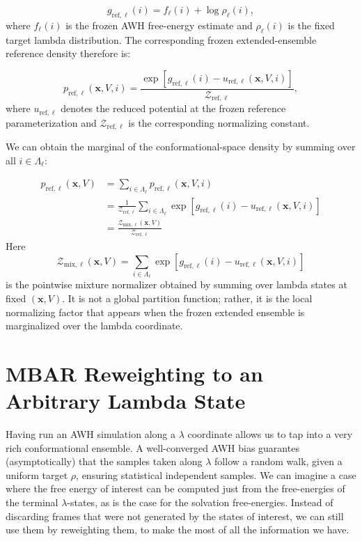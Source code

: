 \begin{equation}
    g_{\mathrm{ref},\ell}(i)
    =
    f_\ell(i)
    +
    \log \rho_\ell(i),
    \label{eq:gref}
\end{equation}
%
where $f_\ell(i)$ is the frozen AWH free-energy estimate and $\rho_\ell(i)$ is the fixed target lambda distribution. The corresponding frozen extended-ensemble reference density therefore is:

\begin{equation}
    p_{\mathrm{ref},\ell}(\mathbf{x}, V, i)
    =
    \frac{
        \exp \left[
            g_{\mathrm{ref},\ell}(i)
            -
            u_{\mathrm{ref},\ell}(\mathbf{x}, V, i)
        \right]
    }{
        \mathcal{Z}_{\mathrm{ref},\ell}
    },
    \label{eq:pref}
\end{equation}
%
where $u_{\mathrm{ref},\ell}$ denotes the reduced potential at the frozen reference parameterization and $\mathcal{Z}_{\mathrm{ref},\ell}$ is the corresponding normalizing constant.

We can obtain the marginal of the conformational-space density by summing over all $i \in \Lambda_\ell$:

\begin{align}
    p_{\mathrm{ref},\ell}(\mathbf{x}, V)
    &=
    \sum_{i\in\Lambda_\ell}{p_{\mathrm{ref},\ell}(\mathbf{x}, V, i)}
    \nonumber\\
    &=
    \frac{1}{\mathcal{Z}_{\mathrm{ref},\ell}}\sum_{i\in\Lambda_\ell}{\exp\left[g_{\mathrm{ref},\ell}(i) - u_{\mathrm{ref},\ell}(\mathbf{x}, V, i)\right]}
    \nonumber\\
    &= 
    \frac{\mathcal{Z}_{\mathrm{mix},\ell}(\mathbf{x}, V)}{\mathcal{Z}_{\mathrm{ref},\ell}}
    \label{eq:pref_int}
\end{align}
%
Here
\[
    \mathcal{Z}_{\mathrm{mix},\ell}(\mathbf{x}, V)
    =
    \sum_{i\in\Lambda_\ell}{\exp\left[g_{\mathrm{ref},\ell}(i) - u_{\mathrm{ref},\ell}(\mathbf{x}, V, i)\right]}
\]
is the pointwise mixture normalizer obtained by summing over lambda states at fixed $(\mathbf{x}, V)$. It is not a global partition function; rather, it is the local normalizing factor that appears when the frozen extended ensemble is marginalized over the lambda coordinate.

\section{MBAR Reweighting to an Arbitrary Lambda State}

Having run an AWH simulation along a $\lambda$ coordinate allows us to tap into a very rich conformational ensemble. A well-converged AWH bias guarantes (asymptotically) that the samples taken along $\lambda$ follow a random walk, given a uniform target $\rho$, ensuring statistical independent samples. We can imagine a case where the free energy of interest can be computed just from the free-energies of the terminal $\lambda$-states, as is the case for the solvation free-energies. Instead of discarding frames that were not generated by the states of interest, we can still use them by reweighting them, to make the most of all the information we have.

